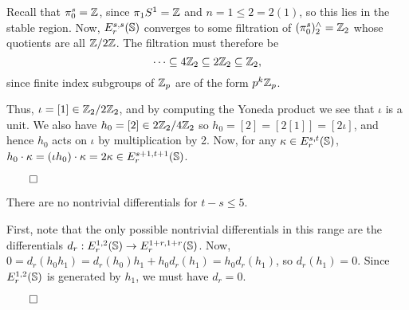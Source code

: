 \documentclass{MetricNotes2023}
\newcommand{\nathaniel}[1]{{\leavevmode\color{teal}[#1]}}
\def\bb{\ensuremath\mathbb}
\def\subq{\ensuremath\subseteq}
\def\inte{\ensuremath\mathbb{Z}}
\def\done{\begin{flushright}\vspace{-4.35ex}\(\qed\)\end{flushright}}
\begin{document}
\begin{ourproof}
Recall that \(\pi_0^s=\inte\), since \(\pi_1S^1=\inte\) and \(n=1\leq 2=2(1)\), so this lies in the stable region. Now, \(E^{s,s}_r(\bb{S})\) converges to some filtration of \((\pi_0^s)^\wedge_2=\inte_2\) whose quotients are all \(\inte/2\inte\). The filtration must therefore be 
\[\cdots\subq 4\inte_2 \subq 2\inte_2 \subq \inte_2,\]
since finite index subgroups of \(\inte_p\) are of the form \(p^k\inte_p\). %

Thus, \(\iota=[1]\in \inte_2/2\inte_2\), and by computing the Yoneda product we see that \(\iota\) is a unit. We also have \(h_0=[2]\in 2\inte_2/4\inte_2\) so \(h_0=[2]=[2[1]]=[2\iota]\), and hence \(h_0\) acts on \(\iota\) by multiplication by 2. Now, for any \(\kappa\in E^{s,t}_r(\bb{S})\), \(h_0\cdot \kappa = (\iota h_0)\cdot \kappa=2\kappa\in E^{s+1,t+1}_r(\bb{S})\). \done
\end{ourproof}



\begin{lemma}\label{2504241225}
There are no nontrivial differentials for \(t-s\leq 5\). 
\end{lemma}

\begin{ourproof}
First, note that the only possible nontrivial differentials in this range are the differentials \(d_r : E_r^{1,2}(\bb{S}) \to E_r^{1+r, 1+r}(\bb{S})\). Now, \(0=d_r(h_0h_1)=d_r(h_0)h_1 + h_0d_r(h_1)=h_0d_r(h_1)\), so \(d_r(h_1)=0\). Since \(E_r^{1, 2}(\bb{S})\) is generated by \(h_1\), we must have \(d_r=0\). \done
\end{ourproof}
\end{document}
